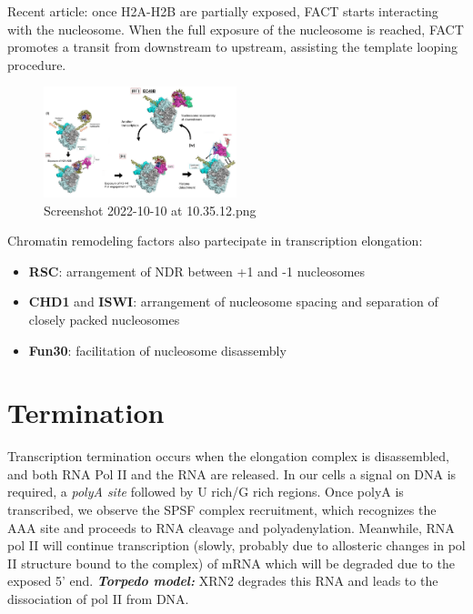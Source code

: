 Recent article: once H2A-H2B are partially exposed, FACT starts interacting with the nucleosome. When the full exposure of the nucleosome is reached, FACT promotes a transit from downstream to upstream, assisting the template looping procedure.

\begin{figure}
\centering
\includegraphics[width=0.5\textwidth]{../_resources/Screenshot_2022-10-10_at_10-35-12.png}
\caption{Screenshot 2022-10-10 at 10.35.12.png}
\end{figure}

Chromatin remodeling factors also partecipate in transcription elongation:

\begin{itemize}
\tightlist
\item
  \textbf{RSC}: arrangement of NDR between +1 and -1 nucleosomes
\item
  \textbf{CHD1} and \textbf{ISWI}: arrangement of nucleosome spacing and separation of closely packed nucleosomes
\item
  \textbf{Fun30}: facilitation of nucleosome disassembly
\end{itemize}

\hypertarget{termination}{%
\section{Termination}\label{termination}}

Transcription termination occurs when the elongation complex is disassembled, and both RNA Pol II and the RNA are released. In our cells a signal on DNA is required, a \emph{polyA site} followed by U rich/G rich regions. Once polyA is transcribed, we observe the SPSF complex recruitment, which recognizes the AAA site and proceeds to RNA cleavage and polyadenylation. Meanwhile, RNA pol II will continue transcription (slowly, probably due to allosteric changes in pol II structure bound to the complex) of mRNA which will be degraded due to the exposed 5' end. \textbf{\emph{Torpedo model:}} XRN2 degrades this RNA and leads to the dissociation of pol II from DNA.

